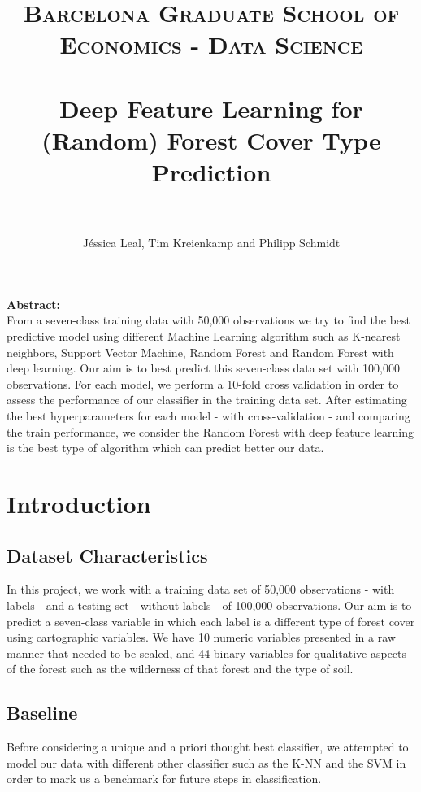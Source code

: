 \documentclass[paper=a4, fontsize=11pt]{scrartcl}
\title{	
\normalfont \normalsize 
\textsc{Barcelona Graduate School of Economics - Data Science} \\ [25pt]
\horrule{2pt} \\[0.5cm] 
\huge Deep Feature Learning for (Random) Forest Cover Type Prediction  \\ 
\horrule{2pt} \\[0.5cm] 
}
\author{J\'essica Leal, Tim Kreienkamp and Philipp Schmidt}
\date{}
\numberwithin{equation}{section}
\numberwithin{figure}{section}
\numberwithin{table}{section}
\begin{document}


\maketitle
\textbf{Abstract:} \\
From a seven-class training data with 50,000 observations we try to find the best predictive model using different Machine Learning algorithm such as K-nearest neighbors, Support Vector Machine, Random Forest and Random Forest with deep learning. Our aim is to best predict this seven-class data set with 100,000 observations. For each model, we perform a 10-fold cross validation in order to assess the performance of our classifier in the training data set. After estimating the best hyperparameters for each model - with cross-validation - and comparing the train performance, we consider the Random Forest with deep feature learning is the best type of algorithm which can predict better our data. 





\section{Introduction}
\subsection{Dataset Characteristics}
In this project, we work with a training data set of 50,000 observations - with labels - and a testing set - without labels - of 100,000 observations. Our aim is to predict a seven-class variable in which each label is a different type of forest cover using cartographic variables. We have 10 numeric variables presented in a raw manner that needed to be scaled, and 44 binary variables for qualitative aspects of the forest such as the wilderness of that forest and the type of soil. 

\newpage



\subsection{Baseline}
Before considering a unique and a priori thought best classifier, we attempted to model our data with different other classifier such as the K-NN and the SVM in order to mark us a benchmark for future steps in classification.
\end{document}
